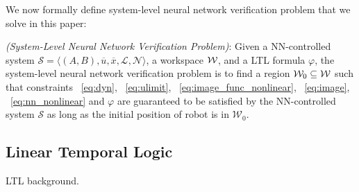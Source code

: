 We now formally define system-level neural network verification problem that we solve in this paper:
\begin{definition}
    \textit{(System-Level Neural Network Verification Problem)}: 
    Given a NN-controlled system $\mathcal{S} = \langle (A, B), \overline{u}, \overline{x}, \mathcal{L}, \mathcal{N} \rangle$, 
    a workspace ${\mathcal{W}}$, and a LTL formula $\varphi$, the system-level neural network verification problem is to find 
    a region $\mathcal{W}_0 \subseteq {\mathcal{W}}$ such that 
    constraints ~\eqref{eq:dyn}, ~\eqref{eq:ulimit}, ~\eqref{eq:image_func_nonlinear}, ~\eqref{eq:image}, ~\eqref{eq:nn_nonlinear}
    and $\varphi$ are guaranteed to be satisfied by the NN-controlled system $\mathcal{S}$
    as long as the initial position of robot is in $\mathcal{W}_0$.
\end{definition}    


\subsection{Linear Temporal Logic}

{\color{blue} LTL background.}



